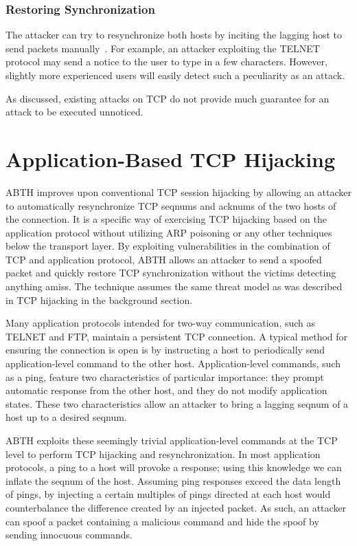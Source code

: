 \documentclass{sig-alternate}
\begin{document}
\subsubsection{Restoring Synchronization}

The attacker can try to resynchronize both hosts by inciting the lagging host to send packets manually~\cite{lam:resync}.
For example, an attacker exploiting the TELNET protocol may send a notice to the user to type in a few characters.
However, slightly more experienced users will easily detect such a peculiarity as an attack.

As discussed, existing attacks on TCP do not provide much guarantee for an attack to be executed unnoticed.

\section{Application-Based TCP Hijacking}

ABTH improves upon conventional TCP session hijacking by allowing an attacker to automatically resynchronize TCP seqnums and acknums of the two hosts of the connection. It is a specific way of exercising TCP hijacking based on the application protocol without utilizing ARP poisoning or any other techniques below the transport layer. By exploiting vulnerabilities in the combination of TCP and application protocol, ABTH allows an attacker to send a spoofed packet and quickly restore TCP synchronization without the victims detecting anything amiss.
The technique assumes the same threat model as was described in TCP hijacking in the background section.

Many application protocols intended for two-way communication, such as TELNET and FTP, maintain a persistent TCP connection. A typical method for ensuring the connection is open is by instructing a host to periodically send application-level command to the other host.
Application-level commands, such as a ping, feature two characteristics of particular importance: they prompt automatic response from the other host, and they do not modify application states.
These two characteristics allow an attacker to bring a lagging seqnum of a host up to a desired seqnum. 

ABTH exploits these seemingly trivial application-level commands at the TCP level to perform TCP hijacking and resynchronization.
In most application protocols, a ping to a host will provoke a response; using this knowledge we can inflate the seqnum of the host. Assuming ping responses exceed the data length of pings, by injecting a certain multiples of pings directed at each host would counterbalance the difference created by an injected packet.
As such, an attacker can spoof a packet containing a malicious command and hide the spoof by sending innocuous commands.
\end{document}
